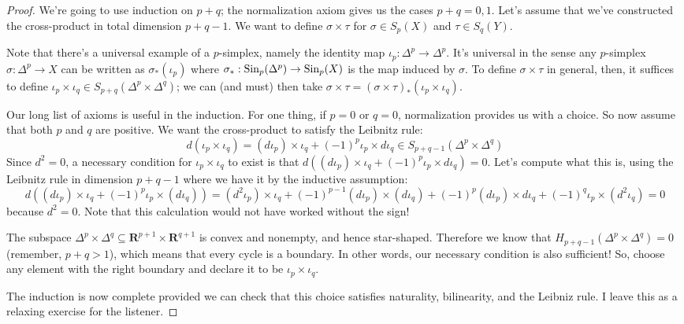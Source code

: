 \begin{proof} We're going to use induction on $p+q$; the normalization axiom 
gives us the cases $p+q=0,1$. Let's assume that we've constructed the cross-product in total dimension $p+q-1$. We want to define $\sigma\times\tau$ for 
$\sigma\in S_p(X)$ and $\tau\in S_q(Y)$. 

Note that there's a universal example of a $p$-simplex, namely the identity map $\iota_p:\Delta^p\to \Delta^p$. It's universal in the sense any $p$-simplex $\sigma:\Delta^p\to X$ can be written as $\sigma_\ast(\iota_p)$ where $\sigma_\ast:\mathrm{Sin}_p(\Delta^p)\to \mathrm{Sin}_p(X)$ is the map induced by $\sigma$. To define $\sigma\times\tau$ in general, then, it suffices to define $\iota_p\times\iota_q\in S_{p+q}(\Delta^p\times\Delta^q)$; we can (and must) then take
$\sigma\times\tau=(\sigma\times\tau)_*(\iota_p\times\iota_q)$. 

Our long list of axioms is useful in the induction. For one thing, if $p=0$ or
$q=0$, normalization provides us with a choice. So now assume that both $p$ and $q$ are positive. We want the cross-product
to satisfy the Leibnitz rule: 
		\begin{equation*}
d(\iota_p\times\iota_q) = (d\iota_p)\times\iota_q + (-1)^p\iota_p\times d\iota_q\in		S_{p+q-1}(\Delta^p\times\Delta^q)
		\end{equation*}
Since $d^2=0$, a necessary condition for $\iota_p\times\iota_q$ to exist is that $d((d\iota_p)\times\iota_q + (-1)^p\iota_p\times d\iota_q) =0$. Let's compute what this is, using the Leibnitz rule in dimension
$p+q-1$ where we have it by the inductive assumption:
		\begin{equation*}
		d((d\iota_p)\times\iota_q + (-1)^p\iota_p\times(d\iota_q)) = (d^2\iota_p)\times\iota_q + (-1)^{p-1}(d\iota_p)\times(d\iota_q) + (-1)^p(d\iota_p)\times d\iota_q + (-1)^q\iota_p\times(d^2\iota_q) = 0
		\end{equation*}
because $d^2=0$. Note that this calculation would not have worked without the sign! 

The subspace $\Delta^p\times\Delta^q\subseteq\mathbf{R}^{p+1}\times\mathbf{R}^{q+1}$ is convex and nonempty, and hence star-shaped. Therefore we know that $ H_{p+q-1}(\Delta^p\times\Delta^q)=0$ (remember, $p+q>1$), which means that every cycle is a boundary. In other words, our necessary condition is also sufficient! So, choose any element 
with the right boundary and declare it to be $\iota_p\times\iota_q$.

The induction is now complete provided we can check that this choice satisfies naturality, bilinearity, and the Leibniz rule. I leave this as a relaxing exercise for the listener. 
\end{proof}

